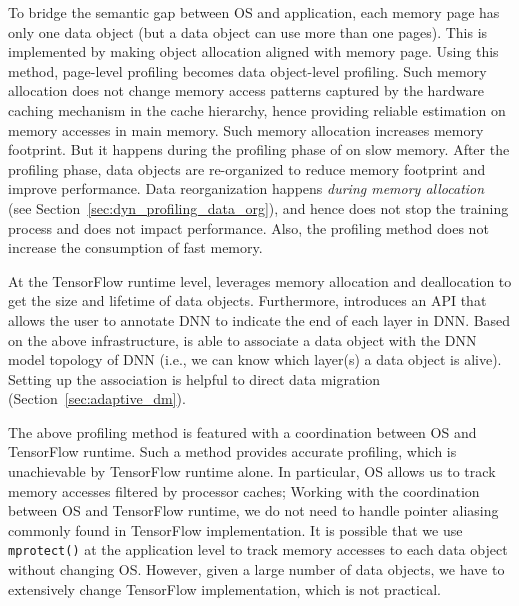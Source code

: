 To bridge the semantic gap between OS and application, each memory page has only one data object (but a data object can use more than one pages). \textcolor{dong}{This is implemented by making object allocation aligned with memory page.} Using this method, page-level profiling becomes data object-level profiling. Such memory allocation does not change memory access patterns captured by the hardware caching mechanism in the cache hierarchy, hence providing reliable estimation on memory accesses in main memory. Such memory allocation increases memory footprint. But it happens during the profiling phase of \name on slow memory. After the profiling phase, data objects are re-organized to reduce memory footprint and improve performance. Data reorganization happens \textit{during memory allocation}  (see Section~\ref{sec:dyn_profiling_data_org}), and hence does not stop the training process and does not impact performance. Also, the profiling method does not increase the consumption of fast memory. 


At the TensorFlow runtime level, \name leverages memory allocation and deallocation to get the size and lifetime of data objects. Furthermore, \name introduces an API that allows the user to annotate DNN to indicate the end of each layer in DNN.
Based on the above infrastructure, \name is able to associate a data object with the DNN model topology of DNN (i.e., we can know which layer(s) a data object is alive). Setting up the association is helpful to direct data migration (Section~\ref{sec:adaptive_dm}). 

\textcolor{dong}{The above profiling method is featured with a coordination between OS and TensorFlow runtime. Such a method provides accurate profiling, which is unachievable by TensorFlow runtime alone. In particular, OS allows us to track memory accesses filtered by processor caches; Working with the coordination between OS and TensorFlow runtime, we do not need to handle pointer aliasing commonly found in TensorFlow implementation. It is possible that we use \texttt{mprotect()} at the application level to track memory accesses to each data object without changing OS. However, given a large number of data objects, we have to extensively change TensorFlow implementation, which is not practical.}



